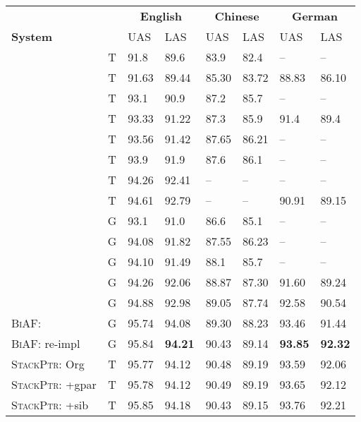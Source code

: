 \documentclass[11pt,a4paper]{article}
\begin{document}
\begin{table*}[t]
\centering
{\small
\begin{tabular}[t]{l|c|ll|ll|ll}
\hline
 & & \multicolumn{2}{c|}{\textbf{English}} & \multicolumn{2}{c|}{\textbf{Chinese}} & \multicolumn{2}{c}{\textbf{German}} \\
 \cline{3-8}
\textbf{System} & & UAS & LAS & UAS & LAS & UAS & LAS \\
\hline
\citet{chen-manning:EMNLP2014} & T & 91.8 & 89.6 & 83.9 & 82.4 & -- & -- \\
\citet{ballesteros-dyer-smith:2015:EMNLP} & T & 91.63 & 89.44 & 85.30 & 83.72 & 88.83 & 86.10 \\
\citet{dyer-EtAl:2015:ACL-IJCNLP} & T & 93.1 & 90.9 & 87.2 & 85.7 & -- & -- \\
\citet{bohnet-nivre:2012:EMNLP-CoNLL} & T & 93.33 & 91.22 & 87.3 & 85.9 & 91.4 & 89.4 \\
\citet{ballesteros-EtAl:2016:EMNLP2016} & T & 93.56 & 91.42 & 87.65 & 86.21 & -- & -- \\
\citet{TACL885} & T & 93.9 & 91.9 & 87.6 & 86.1 & -- & -- \\
\citet{weiss:2015:ACL} & T & 94.26 & 92.41 & -- & -- & -- & -- \\
\citet{andor-EtAl:2016:P16-1} & T & 94.61 & 92.79 & -- & -- & 90.91 & 89.15 \\
\hline
\citet{TACL885} & G & 93.1 & 91.0 & 86.6 & 85.1 & -- & -- \\
\citet{wang-chang:2016:P16-1} & G & 94.08 & 91.82 & 87.55 & 86.23 & -- & -- \\
\citet{cheng-EtAl:2016:EMNLP2016} & G & 94.10 & 91.49 & 88.1 & 85.7 & -- & -- \\
\citet{kuncoro-EtAl:2016:EMNLP2016} & G & 94.26 & 92.06 & 88.87 & 87.30 & 91.60 & 89.24 \\
\citet{ma-hovy:2017:I17-1} & G & 94.88 & 92.98 & 89.05 & 87.74 & 92.58 & 90.54 \\
\textsc{BiAF}: \citet{dozat2017:ICLR} & G & 95.74 & 94.08 & 89.30 & 88.23 & 93.46 & 91.44 \\
\textsc{BiAF}: re-impl & G & 95.84 & \textbf{94.21} & 90.43 & 89.14 & \textbf{93.85} & \textbf{92.32} \\
\hline
\textsc{StackPtr}: \textsf{Org} & T & 95.77 & 94.12 & 90.48 & 89.19 & 93.59 & 92.06 \\
\textsc{StackPtr}: \textsf{+gpar} & T & 95.78 & 94.12 & 90.49 & 89.19 & 93.65 & 92.12 \\
\textsc{StackPtr}: \textsf{+sib}  & T & 95.85 & 94.18 & 90.43 & 89.15 & 93.76 & 92.21 \\

\end{tabular}}
\end{table*}
\end{document}
